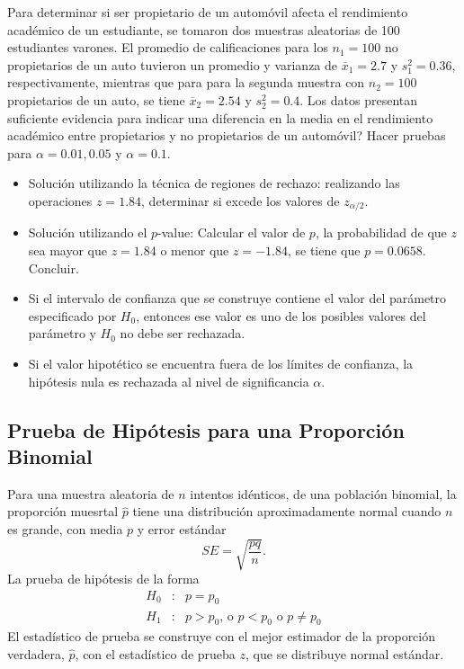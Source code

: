 \begin{Ejem}
Para determinar si ser propietario de un autom\'ovil afecta el rendimiento acad\'emico de un estudiante, se tomaron dos muestras aleatorias de 100 estudiantes varones. El promedio de calificaciones para los $n_{1}=100$ no propietarios de un auto tuvieron un promedio y varianza de $\overline{x}_{1}=2.7$ y $s_{1}^{2}=0.36$, respectivamente, mientras que para para la segunda muestra con $n_{2}=100$ propietarios de un auto, se tiene $\overline{x}_{2}=2.54$ y $s_{2}^{2}=0.4$. Los datos presentan suficiente evidencia para indicar una diferencia en la media en el rendimiento acad\'emico entre propietarios y no propietarios de un autom\'ovil? Hacer pruebas para $\alpha=0.01,0.05$ y $\alpha=0.1$.

\begin{itemize}
\item Soluci\'on utilizando la t\'ecnica de regiones de rechazo:\medskip
realizando las operaciones
$z=1.84$, determinar si excede los valores de $z_{\alpha/2}$.
\item Soluci\'on utilizando el $p$-value:\medskip
Calcular el valor de $p$, la probabilidad de que $z$ sea mayor que $z=1.84$ o menor que $z=-1.84$, se tiene que $p=0.0658$. Concluir.

\item Si el intervalo de confianza que se construye contiene el valor del par\'ametro especificado por $H_{0}$, entonces ese valor es uno de los posibles valores del par\'ametro y $H_{0}$ no debe ser rechazada.

\item Si el valor hipot\'etico se encuentra fuera de los l\'imites de confianza, la hip\'otesis nula es rechazada al nivel de significancia $\alpha$.
\end{itemize}
\end{Ejem}
\subsection*{Prueba de Hip\'otesis para una Proporci\'on Binomial}
Para una muestra aleatoria de $n$ intentos id\'enticos, de una poblaci\'on binomial, la proporci\'on muesrtal $\hat{p}$ tiene una distribuci\'on aproximadamente normal cuando $n$ es grande, con media $p$ y error est\'andar
$$SE=\sqrt{\frac{pq}{n}}.$$
La prueba de hip\'otesis de la forma
\begin{eqnarray*}
H_{0}&:&p=p_{0}\\
H_{1}&:&p>p_{0}\textrm{, o }p<p_{0}\textrm{ o }p\neq p_{0}
\end{eqnarray*}
El estad\'istico de prueba se construye con el mejor estimador de la proporci\'on verdadera, $\hat{p}$, con el estad\'istico de prueba $z$, que se distribuye normal est\'andar.

